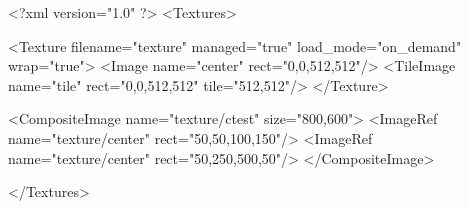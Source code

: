 <?xml version="1.0" ?>
<Textures>

	<Texture filename="texture" managed="true" load_mode="on_demand" wrap="true">
		<Image name="center" rect="0,0,512,512"/>
		<TileImage name="tile" rect="0,0,512,512" tile="512,512"/>
	</Texture>
	
	<CompositeImage name="texture/ctest" size="800,600">
		<ImageRef name="texture/center" rect="50,50,100,150"/>
		<ImageRef name="texture/center" rect="50,250,500,50"/>
	</CompositeImage>

</Textures>
